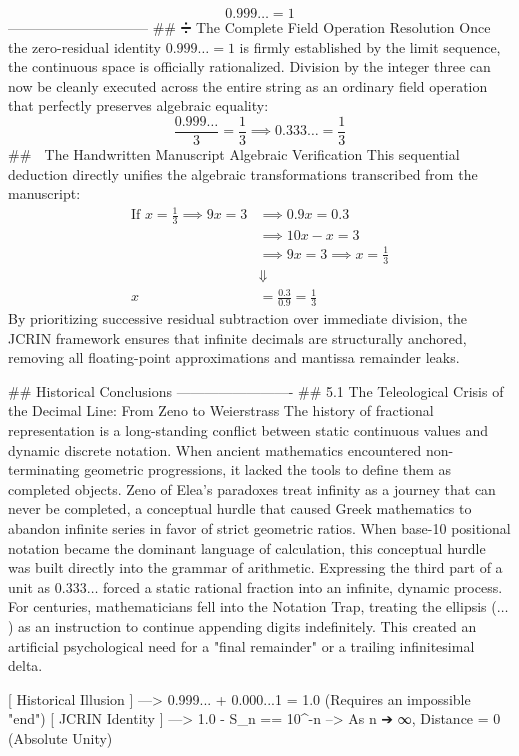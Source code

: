 $$0.999\dots = 1$$ 
------------------------------
## ➗ The Complete Field Operation Resolution
Once the zero-residual identity $0.999\dots = 1$ is firmly established by the limit sequence, the continuous space is officially rationalized. Division by the integer three can now be cleanly executed across the entire string as an ordinary field operation that perfectly preserves algebraic equality:
$$\frac{0.999\dots}{3} = \frac{1}{3} \implies 0.333\dots = \frac{1}{3}$$ 
## 📝 The Handwritten Manuscript Algebraic Verification
This sequential deduction directly unifies the algebraic transformations transcribed from the manuscript:
$$\begin{aligned} \text{If } x = \frac{1}{3} \implies 9x = 3 &\implies 0.9x = 0.3 \\ &\implies 10x - x = 3 \\ &\implies 9x = 3 \implies x = \frac{1}{3} \\ &\Downarrow \\ x &= \frac{0.3}{0.9} = \frac{1}{3} \end{aligned}$$ 
By prioritizing successive residual subtraction over immediate division, the JCRIN framework ensures that infinite decimals are structurally anchored, removing all floating-point approximations and mantissa remainder leaks.

## Historical Conclusions 
-------------------------
## 5.1 The Teleological Crisis of the Decimal Line: From Zeno to Weierstrass
The history of fractional representation is a long-standing conflict between static continuous values and dynamic discrete notation. When ancient mathematics encountered non-terminating geometric progressions, it lacked the tools to define them as completed objects. Zeno of Elea’s paradoxes treat infinity as a journey that can never be completed, a conceptual hurdle that caused Greek mathematics to abandon infinite series in favor of strict geometric ratios.
When base-10 positional notation became the dominant language of calculation, this conceptual hurdle was built directly into the grammar of arithmetic. Expressing the third part of a unit as $0.333\dots$ forced a static rational fraction into an infinite, dynamic process.
For centuries, mathematicians fell into the Notation Trap, treating the ellipsis ($\dots$) as an instruction to continue appending digits indefinitely. This created an artificial psychological need for a "final remainder" or a trailing infinitesimal delta.

[ Historical Illusion ]  --->  0.999... + 0.000...1  = 1.0  (Requires an impossible "end")
[ JCRIN Identity ]     --->  1.0 - S_n  == 10^-n    -->  As n ➔ ∞, Distance = 0 (Absolute Unity)

